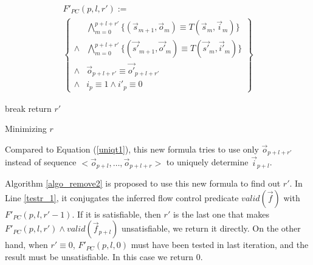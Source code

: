 \documentclass[conference]{IEEEtran}
\begin{document}
\begin{multline}\label{uniqt11}
F'_{PC}(p,l,r'):=\\
\left\{
\begin{array}{cc}
&\bigwedge_{m=0}^{p+l+r'}
\{
(\vec{s}_{m+1},\vec{o}_m)\equiv T(\vec{s}_m,\vec{i}_m)
\}
\\
\wedge&\bigwedge_{m=0}^{p+l+r'}
\{
(\vec{s'}_{m+1},\vec{o'}_m)\equiv T(\vec{s'}_m,\vec{i'}_m)
\}
\\
\wedge&\vec{o}_{p+l+r'}\equiv \vec{o'}_{p+l+r'} \\
\wedge& i_{p}\equiv 1 \wedge  i'_{p}\equiv 0 
\end{array}
\right\}
\end{multline}


\begin{algorithm}[t]
\SetAlgoVlined
{} {
   {
    break
  }
}
return $r'$
\caption{Minimizing $r$}
\label{algo_remove2}
\end{algorithm}

Compared to Equation (\ref{uniqt1}),
this new formula tries to use only $\vec{o}_{p+l+r'}$ instead of 
sequence $<\vec{o}_{p+l},\dots,\vec{o}_{p+l+r}>$ to uniquely determine $\vec{i}_{p+l}$.

Algorithm \ref{algo_remove2} is proposed to use this new formula to find out $r'$.
In Line \ref{testr_1},
it conjugates the inferred flow control predicate $valid(\vec{f})$  with $F'_{PC}(p,l,r'-1)$.
If it is satisfiable,
then $r'$ is the last one that makes $F'_{PC}(p,l,r')\wedge valid(\vec{f}_{p+l})$ unsatisfiable,
we return it directly.
On the other hand,
when $r'\equiv 0$,
$F'_{PC}(p,l,0)$ must have been tested in last iteration,
and the result must be unsatisfiable.
In this case we return $0$.
\end{document}
